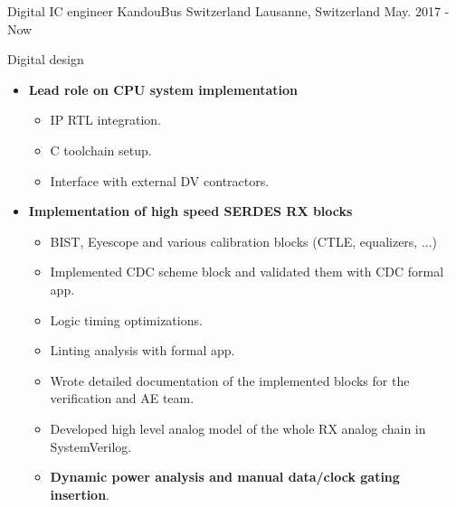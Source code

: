 

\begin{cventries}

  \cventry
    {Digital IC engineer} %
    {KandouBus Switzerland} %
    {Lausanne, Switzerland} %
    {May. 2017 - Now} %
    {
      \begin{cvitems} %
        \item {Digital design}
        \begin{itemize}
          \item {\textbf{Lead role on CPU system implementation}}
          \begin{itemize}
            \item {IP RTL integration.}
            \item {C toolchain setup.}
            \item {Interface with external DV contractors.}
          \end{itemize}
          \item {\textbf{Implementation of high speed SERDES RX blocks}}
          \begin{itemize}
            \item {BIST, Eyescope and various calibration blocks (CTLE, equalizers, ...)}
            \item {Implemented CDC scheme block and validated them with CDC formal app.}
            \item {Logic timing optimizations.}
            \item {Linting analysis with formal app.}
            \item {Wrote detailed documentation of the implemented blocks for the verification and AE team.}
            \item {Developed high level analog model of the whole RX analog chain in SystemVerilog.}
            \item {\textbf{Dynamic power analysis and manual data/clock gating insertion}.}

\end{itemize}
\end{itemize}
\end{cvitems}}
\end{cventries}
